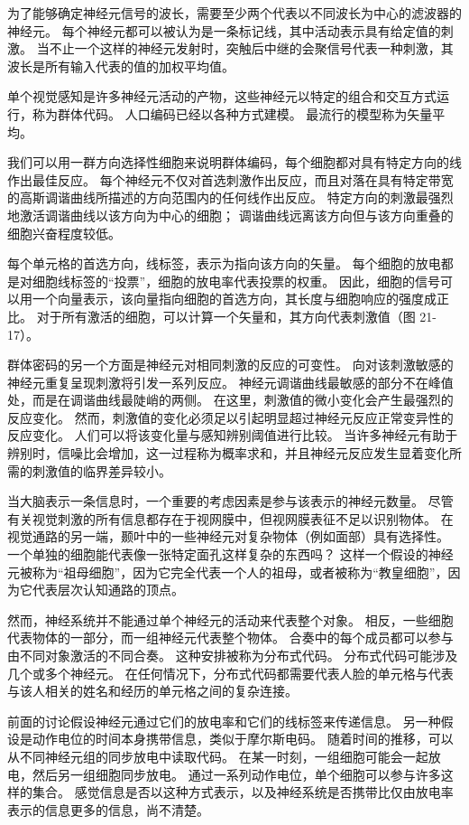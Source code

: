 为了能够确定神经元信号的波长，需要至少两个代表以不同波长为中心的滤波器的神经元。 每个神经元都可以被认为是一条标记线，其中活动表示具有给定值的刺激。 当不止一个这样的神经元发射时，突触后中继的会聚信号代表一种刺激，其波长是所有输入代表的值的加权平均值。

单个视觉感知是许多神经元活动的产物，这些神经元以特定的组合和交互方式运行，称为群体代码。 人口编码已经以各种方式建模。 最流行的模型称为矢量平均。

我们可以用一群方向选择性细胞来说明群体编码，每个细胞都对具有特定方向的线作出最佳反应。 每个神经元不仅对首选刺激作出反应，而且对落在具有特定带宽的高斯调谐曲线所描述的方向范围内的任何线作出反应。 特定方向的刺激最强烈地激活调谐曲线以该方向为中心的细胞； 调谐曲线远离该方向但与该方向重叠的细胞兴奋程度较低。

每个单元格的首选方向，线标签，表示为指向该方向的矢量。 每个细胞的放电都是对细胞线标签的“投票”，细胞的放电率代表投票的权重。 因此，细胞的信号可以用一个向量表示，该向量指向细胞的首选方向，其长度与细胞响应的强度成正比。 对于所有激活的细胞，可以计算一个矢量和，其方向代表刺激值（图 21-17）。

群体密码的另一个方面是神经元对相同刺激的反应的可变性。 向对该刺激敏感的神经元重复呈现刺激将引发一系列反应。 神经元调谐曲线最敏感的部分不在峰值处，而是在调谐曲线最陡峭的两侧。 在这里，刺激值的微小变化会产生最强烈的反应变化。 然而，刺激值的变化必须足以引起明显超过神经元反应正常变异性的反应变化。 人们可以将该变化量与感知辨别阈值进行比较。 当许多神经元有助于辨别时，信噪比会增加，这一过程称为概率求和，并且神经元反应发生显着变化所需的刺激值的临界差异较小。

当大脑表示一条信息时，一个重要的考虑因素是参与该表示的神经元数量。 尽管有关视觉刺激的所有信息都存在于视网膜中，但视网膜表征不足以识别物体。 在视觉通路的另一端，颞叶中的一些神经元对复杂物体（例如面部）具有选择性。 一个单独的细胞能代表像一张特定面孔这样复杂的东西吗？ 这样一个假设的神经元被称为“祖母细胞”，因为它完全代表一个人的祖母，或者被称为“教皇细胞”，因为它代表层次认知通路的顶点。

然而，神经系统并不能通过单个神经元的活动来代表整个对象。 相反，一些细胞代表物体的一部分，而一组神经元代表整个物体。 合奏中的每个成员都可以参与由不同对象激活的不同合奏。 这种安排被称为分布式代码。 分布式代码可能涉及几个或多个神经元。 在任何情况下，分布式代码都需要代表人脸的单元格与代表与该人相关的姓名和经历的单元格之间的复杂连接。

前面的讨论假设神经元通过它们的放电率和它们的线标签来传递信息。 另一种假设是动作电位的时间本身携带信息，类似于摩尔斯电码。 随着时间的推移，可以从不同神经元组的同步放电中读取代码。 在某一时刻，一组细胞可能会一起放电，然后另一组细胞同步放电。 通过一系列动作电位，单个细胞可以参与许多这样的集合。 感觉信息是否以这种方式表示，以及神经系统是否携带比仅由放电率表示的信息更多的信息，尚不清楚。


